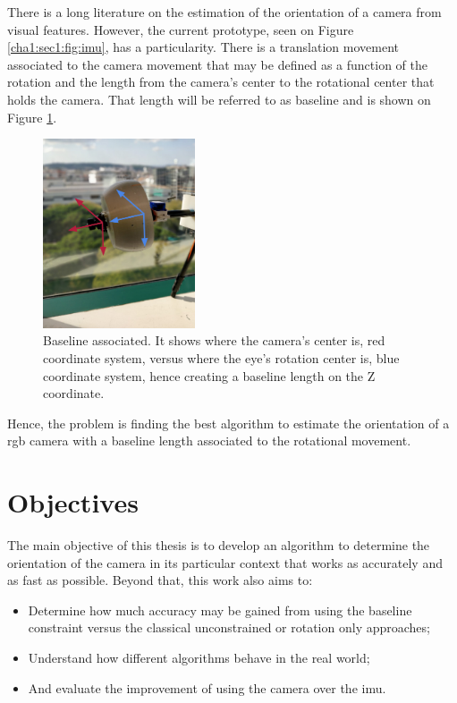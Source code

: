 There is a long literature on the estimation of the orientation of a camera from visual features. However, the current prototype, seen on Figure \ref{cha1:sec1:fig:imu}, has a particularity. There is a translation movement associated to the camera movement that may be defined as a function of the rotation and the length from the camera's center to the rotational center that holds the camera. That length will be referred to as baseline and is shown on Figure \ref{cha1:sec1:fig:baseline}.

\begin{figure}[ht]
	\centering
	\includegraphics[width=0.4\textwidth]{images/prototypeaxis.png}
	\caption[Baseline associated]{Baseline associated. It shows where the camera's center is, red coordinate system, versus where the eye's rotation center is, blue coordinate system, hence creating a baseline length on the Z coordinate.}
	\label{cha1:sec1:fig:baseline}
\end{figure}

Hence, the problem is finding the best algorithm to estimate the orientation of a \acrshort{rgb} camera with a baseline length associated to the rotational movement.

\section{Objectives}
\label{cha1:objectives}

The main objective of this thesis is to develop an algorithm to determine the orientation of the camera in its particular context that works as accurately and as 	fast as possible. Beyond that, this work also aims to:

\begin{itemize}
\item Determine how much accuracy may be gained from using the baseline constraint versus the classical unconstrained or rotation only approaches;
\item Understand how different algorithms behave in the real world;
\item And evaluate the improvement of using the camera over the  \acrshort{imu}.
\end{itemize}


